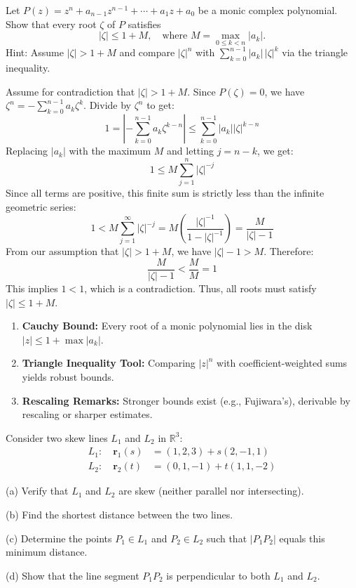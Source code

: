 \begin{problem}
Let $P(z) = z^n + a_{n-1}z^{n-1} + \cdots + a_1 z + a_0$ be a monic complex polynomial. Show that every root $\zeta$ of $P$ satisfies
\[ |\zeta| \le 1 + M, \quad \text{where } M = \max_{0\le k < n} |a_k|. \]
Hint: Assume $|\zeta| > 1+M$ and compare $|\zeta|^n$ with $\sum_{k=0}^{n-1} |a_k|\,|\zeta|^k$ via the triangle inequality.
\end{problem}

\begin{solution}
Assume for contradiction that $|\zeta| > 1 + M$. 
Since $P(\zeta) = 0$, we have $\zeta^n = -\sum_{k=0}^{n-1} a_k \zeta^k$.
Divide by $\zeta^n$ to get:
\[ 1 = \left| -\sum_{k=0}^{n-1} a_k \zeta^{k-n} \right| \le \sum_{k=0}^{n-1} |a_k| |\zeta|^{k-n} \]
Replacing $|a_k|$ with the maximum $M$ and letting $j = n-k$, we get:
\[ 1 \le M \sum_{j=1}^{n} |\zeta|^{-j} \]
Since all terms are positive, this finite sum is strictly less than the infinite geometric series:
\[ 1 < M \sum_{j=1}^{\infty} |\zeta|^{-j} = M \left( \frac{|\zeta|^{-1}}{1 - |\zeta|^{-1}} \right) = \frac{M}{|\zeta| - 1} \]
From our assumption that $|\zeta| > 1 + M$, we have $|\zeta| - 1 > M$. 
Therefore:
\[ \frac{M}{|\zeta| - 1} < \frac{M}{M} = 1 \]
This implies $1 < 1$, which is a contradiction. 
Thus, all roots must satisfy $|\zeta| \le 1 + M$.
\end{solution}

\begin{takeaways}
\begin{enumerate}
    \item \textbf{Cauchy Bound:} Every root of a monic polynomial lies in the disk $|z| \le 1 + \max |a_k|$.
    \item \textbf{Triangle Inequality Tool:} Comparing $|z|^n$ with coefficient-weighted sums yields robust bounds.
    \item \textbf{Rescaling Remarks:} Stronger bounds exist (e.g., Fujiwara’s), derivable by rescaling or sharper estimates.
\end{enumerate}
\end{takeaways}

\begin{problem}
Consider two skew lines $L_1$ and $L_2$ in $\mathbb{R}^3$:
\begin{align}
L_1: \quad \mathbf{r}_1(s) &= (1, 2, 3) + s(2, -1, 1) \\
L_2: \quad \mathbf{r}_2(t) &= (0, 1, -1) + t(1, 1, -2)
\end{align}

(a) Verify that $L_1$ and $L_2$ are skew (neither parallel nor intersecting).

(b) Find the shortest distance between the two lines.

(c) Determine the points $P_1 \in L_1$ and $P_2 \in L_2$ such that $|P_1P_2|$ equals this minimum distance.

(d) Show that the line segment $P_1P_2$ is perpendicular to both $L_1$ and $L_2$.
\end{problem}

